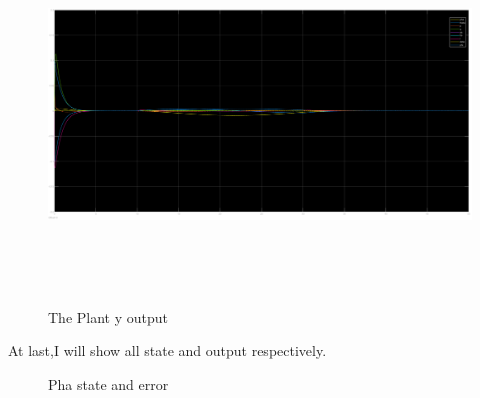 \documentclass[12pt, a4paper]{article}
\begin{document}
\begin{enumerate}[1.]
\begin{figure}[H]
    \centering
    \includegraphics[width=20cm,height=10cm,scale=0.6]{state_output.png}
    \caption{The Plant y output}
    \label{fig:label}
    \end{figure}
At last,I will show all state and output respectively.\\
\begin{figure}[H]
        \centering
        \qquad
        \caption{Pha state and error}
        \label{fig:example}%
    \end{figure}


\end{enumerate}
\end{document}
